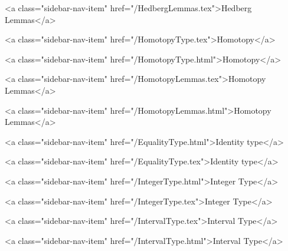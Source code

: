       
    
      
        
          <a class="sidebar-nav-item" href="/HedbergLemmas.tex">Hedberg Lemmas</a>
        
      
    
      
        
          <a class="sidebar-nav-item" href="/HomotopyType.tex">Homotopy</a>
        
      
    
      
        
          <a class="sidebar-nav-item" href="/HomotopyType.html">Homotopy</a>
        
      
    
      
        
          <a class="sidebar-nav-item" href="/HomotopyLemmas.tex">Homotopy Lemmas</a>
        
      
    
      
        
          <a class="sidebar-nav-item" href="/HomotopyLemmas.html">Homotopy Lemmas</a>
        
      
    
      
        
          <a class="sidebar-nav-item" href="/EqualityType.html">Identity type</a>
        
      
    
      
        
          <a class="sidebar-nav-item" href="/EqualityType.tex">Identity type</a>
        
      
    
      
        
          <a class="sidebar-nav-item" href="/IntegerType.html">Integer Type</a>
        
      
    
      
        
          <a class="sidebar-nav-item" href="/IntegerType.tex">Integer Type</a>
        
      
    
      
        
          <a class="sidebar-nav-item" href="/IntervalType.tex">Interval Type</a>
        
      
    
      
        
          <a class="sidebar-nav-item" href="/IntervalType.html">Interval Type</a>
        
